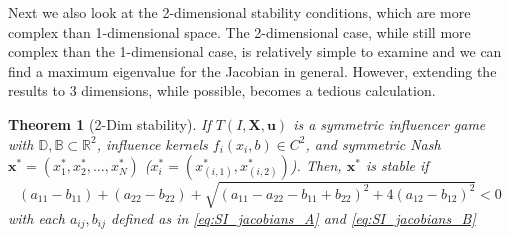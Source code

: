 \documentclass{article}
\newtheorem{theorem}{Theorem}[section]
\newcommand {\R}{\mathbb{R}}
\newcommand {\D}{\mathbb{D}}
\newcommand {\B}{\mathbb{B}}
\begin{document}
            Next we also look at the 2-dimensional stability conditions, which are more complex than 1-dimensional space. The 2-dimensional case, while still more complex than the 1-dimensional case, is relatively simple to examine and we can find a maximum eigenvalue for the Jacobian in general. However, extending the results to 3 dimensions, while possible, becomes a tedious calculation.
            \begin{theorem}[2-Dim stability] \label{thm:SI_two_dimensional_stability}
                If $T(I,\mathbf{X},\mathbf{u})$ is a symmetric influencer game with $\D,\B\subset \R^2$, influence kernels $f_i(x_i,b)\in C^2$, and symmetric Nash $\mathbf{x}^*=(x_1^*,x_2^*,\dots,x_N^*)$ ($x_i^*=(x_{(i,1)}^*,x_{(i,2)}^*)$). Then, $\mathbf{x}^*$ is stable if 
                \begin{equation}
                   (a_{11}-b_{11})+(a_{22}-b_{22})+ \sqrt{(a_{11}-a_{22}-b_{11}+b_{22})^2+4(a_{12}-b_{12})^2}<0
                \end{equation} 
                with each $a_{ij},b_{ij}$ defined as in \cref{eq:SI_jacobians_A} and \cref{eq:SI_jacobians_B}
            \end{theorem}
\end{document}
